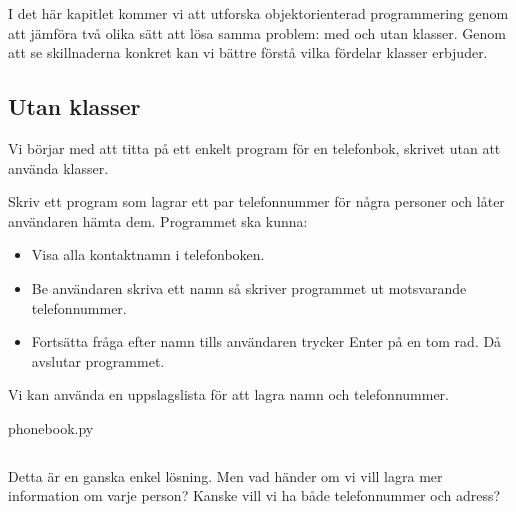 I det här kapitlet kommer vi att utforska objektorienterad programmering
genom att jämföra två olika sätt att lösa samma problem: med och utan
klasser. Genom att se skillnaderna konkret kan vi bättre förstå vilka
fördelar klasser erbjuder.

\subsection{Utan klasser}

Vi börjar med att titta på ett enkelt program för en telefonbok, skrivet
utan att använda klasser.
\begin{exercise}
  Skriv ett program som lagrar ett par telefonnummer för några personer och
  låter användaren hämta dem.
  Programmet ska kunna:
  \begin{itemize}
    \item Visa alla kontaktnamn i telefonboken.
    \item Be användaren skriva ett namn så skriver programmet ut motsvarande
      telefonnummer.
    \item Fortsätta fråga efter namn tills användaren trycker Enter på en tom rad.
      Då avslutar programmet.
  \end{itemize}
\end{exercise}


Vi kan använda en uppslagslista för att lagra namn och telefonnummer.

\begin{frame}[fragile]
  phonebook.py \hrulefill
  \inputminted[linenos]{python}{examples/phonebook.py}
\end{frame}

Detta är en ganska enkel lösning. Men vad händer om vi vill lagra mer
information om varje person? Kanske vill vi ha både telefonnummer och
adress?


